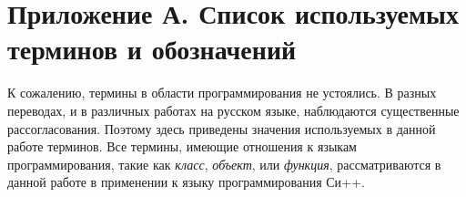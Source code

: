 \newpage


\renewcommand{\appendixtocname}{Приложение А. Список используемых терминов и обозначений}

\appendix
\addappheadtotoc
\section*{Приложение А. Список используемых терминов и обозначений}
К сожалению, термины в области программирования не устоялись. В разных переводах, и в различных работах на русском языке, наблюдаются существенные рассогласования. Поэтому здесь приведены значения используемых в данной работе терминов. Все термины, имеющие отношения к языкам программирования, такие как {\it класс}, {\it объект}, или {\it функция}, рассматриваются в данной работе в применении к языку программирования Си++.

